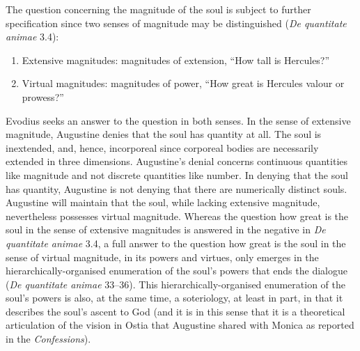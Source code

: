 \documentclass[12pt]{article}
\begin{document}
The question concerning the magnitude of the soul is subject to further specification since two senses of magnitude may be distinguished (\emph{De quantitate animae} 3.4):
\begin{enumerate}[(1)]
	\item Extensive magnitudes: magnitudes of extension, “How tall is Hercules?”
	\item Virtual magnitudes: magnitudes of power, “How great is Hercules valour or prowess?”
\end{enumerate}
Evodius seeks an answer to the question in both senses. In the sense of extensive magnitude, Augustine denies that the soul has quantity at all. The soul is inextended, and, hence, incorporeal since corporeal bodies are necessarily extended in three dimensions. Augustine's denial concerns continuous quantities like magnitude and not discrete quantities like number. In denying that the soul has quantity, Augustine is not denying that there are numerically distinct souls. Augustine will maintain that the soul, while lacking extensive magnitude, nevertheless possesses virtual magnitude. Whereas the question how great is the soul in the sense of extensive magnitudes is answered in the negative in \emph{De quantitate animae} 3.4, a full answer to the question how great is the soul in the sense of virtual magnitude, in its powers and virtues, only emerges in the hierarchically-organised enumeration of the soul’s powers that ends the dialogue (\emph{De quantitate animae} 33–36). This hierarchically-organised enumeration of the soul’s powers is also, at the same time, a soteriology, at least in part, in that it describes the soul’s ascent to God (and it is in this sense that it is a theoretical articulation of the vision in Ostia that Augustine shared with Monica as reported in the \emph{Confessions}).
\end{document}
